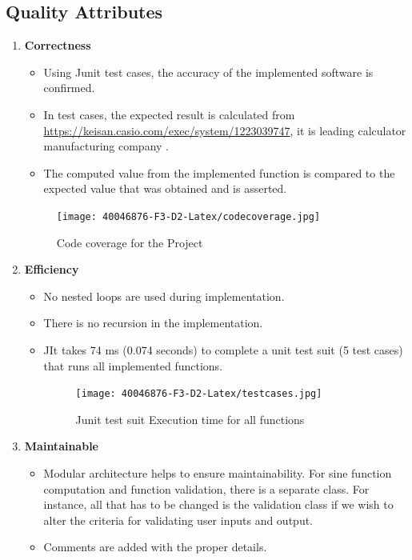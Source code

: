 \documentclass[
	12pt
]{article}
\begin{document}
\subsection{Quality Attributes}
\begin{enumerate}
    \item \textbf{Correctness}
    \begin{itemize}
        \item Using Junit test cases, the accuracy of the implemented software is confirmed.
        \item In test
cases, the expected result is calculated from\newline
\url{https://keisan.casio.com/exec/system/1223039747}, it is leading calculator manufacturing
company \cite{casio}. \
\item The computed value from the implemented function is compared to the expected value that was obtained and is asserted.
    \end{itemize}
    \begin{figure}[htp]
    \centering
    \texttt{[image: 40046876-F3-D2-Latex/codecoverage.jpg]}
    \caption{Code coverage for the Project}
    \label{Code coverage for the Project}
\end{figure}
\item \textbf{Efficiency}
\begin{itemize}
    \item No nested loops are used during implementation.
    \item There is no recursion in the implementation.
    \item JIt takes 74 ms (0.074 seconds) to complete a unit test suit (5 test cases) that runs all implemented functions.
     \begin{figure}[htp]
    \centering
    \texttt{[image: 40046876-F3-D2-Latex/testcases.jpg]}
    \caption{ Junit test suit Execution time for all functions}
    \label{Execution time for all functions}
\end{figure}
\end{itemize}\newpage
\item \textbf{Maintainable}
\begin{itemize}
    \item Modular architecture helps to ensure maintainability.
For sine function computation and function validation, there is a separate class. For instance, all that has to be changed is the validation class if we wish to alter the criteria for validating user inputs and output.
\item Comments are added with the proper details.

\end{itemize}
\end{enumerate}
\end{document}
